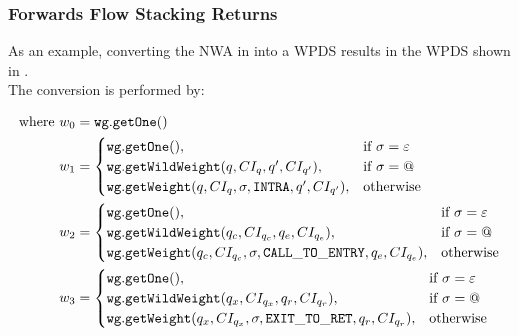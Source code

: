 \subsubsection{Forwards Flow Stacking Returns}

As an example, converting the NWA in  into a WPDS results
in the WPDS shown in . \\


The conversion is performed by:


\begin{align*}
\text{where }
w_0 &= \mathtt{wg.getOne}() \\
w_1 &= \begin{cases}
           \mathtt{wg.getOne}(), & \text{if } \sigma = \varepsilon \\
           \mathtt{wg.getWildWeight}(q,CI_q,q',CI_{q'}), & \text{if } \sigma = \text{\ensuremath{@}} \\
           \mathtt{wg.getWeight}(q,CI_q,\sigma, \mathtt{INTRA},q',CI_{q'}), & \text{otherwise}
       \end{cases} \\
w_2 &= \begin{cases}
           \mathtt{wg.getOne}(), & \text{if } \sigma = \varepsilon \\
           \mathtt{wg.getWildWeight}(q_c,CI_{q_c},q_e,CI_{q_e}), & \text{if } \sigma = \text{\ensuremath{@}} \\
           \mathtt{wg.getWeight}(q_c,CI_{q_c},\sigma, \mathtt{CALL\_TO\_ENTRY},q_e,CI_{q_e}), & \text{otherwise}
      \end{cases} \\
w_3 &= \begin{cases}
          \mathtt{wg.getOne}(), & \text{if } \sigma = \varepsilon \\
          \mathtt{wg.getWildWeight}(q_x,CI_{q_x},q_r,CI_{q_r}), & \text{if } \sigma = \text{\ensuremath{@}} \\
          \mathtt{wg.getWeight}(q_x,CI_{q_x},\sigma, \mathtt{EXIT\_TO\_RET},q_r,CI_{q_r}), & \text{otherwise}
      \end{cases} 
\end{align*}
